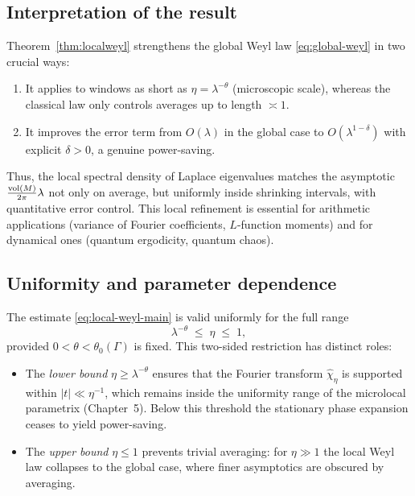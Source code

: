 \subsection{Interpretation of the result}

Theorem~\ref{thm:localweyl} strengthens the global Weyl law \eqref{eq:global-weyl} in two crucial ways:

\begin{enumerate}
\item It applies to windows as short as $\eta=\lambda^{-\theta}$ (microscopic scale), whereas the classical law only controls averages up to length $\asymp 1$.  
\item It improves the error term from $O(\lambda)$ in the global case to $O(\lambda^{1-\delta})$ with explicit $\delta>0$, a genuine power-saving.  
\end{enumerate}

Thus, the local spectral density of Laplace eigenvalues matches the asymptotic $\tfrac{\operatorname{vol}(M)}{2\pi}\lambda$ not only on average, but uniformly inside shrinking intervals, with quantitative error control. This local refinement is essential for arithmetic applications (variance of Fourier coefficients, $L$-function moments) and for dynamical ones (quantum ergodicity, quantum chaos).


\subsection{Uniformity and parameter dependence}

The estimate \eqref{eq:local-weyl-main} is valid uniformly for the full range
\[
\lambda^{-\theta} \;\le\; \eta \;\le\; 1,
\]
provided $0<\theta<\theta_0(\Gamma)$ is fixed. This two-sided restriction has distinct roles:

\begin{itemize}
  \item The \emph{lower bound} $\eta \ge \lambda^{-\theta}$ ensures that the Fourier transform $\widehat{\chi}_\eta$ is supported within $|t|\ll \eta^{-1}$, which remains inside the uniformity range of the microlocal parametrix (Chapter~5). Below this threshold the stationary phase expansion ceases to yield power-saving.
  \item The \emph{upper bound} $\eta \le 1$ prevents trivial averaging: for $\eta\gg 1$ the local Weyl law collapses to the global case, where finer asymptotics are obscured by averaging.
\end{itemize}

